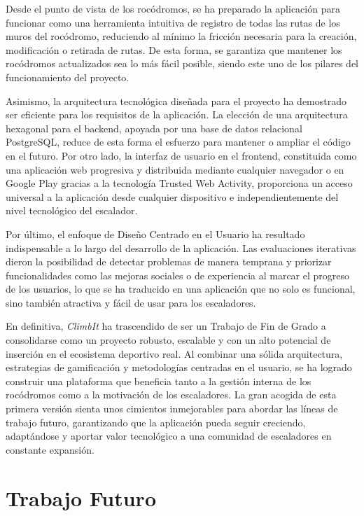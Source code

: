 Desde el punto de vista de los rocódromos, se ha preparado la aplicación para funcionar como una herramienta intuitiva de registro de todas las rutas de los muros del rocódromo, reduciendo al mínimo la fricción necesaria para la creación, modificación o retirada de rutas. De esta forma, se garantiza que mantener los rocódromos actualizados sea lo más fácil posible, siendo este uno de los pilares del funcionamiento del proyecto.

Asimismo, la arquitectura tecnológica diseñada para el proyecto ha demostrado ser eficiente para los requisitos de la aplicación. La elección de una arquitectura hexagonal para el backend, apoyada por una base de datos relacional PostgreSQL, reduce de esta forma el esfuerzo para mantener o ampliar el código en el futuro. Por otro lado, la interfaz de usuario en el frontend, constituida como una aplicación web progresiva y distribuida mediante cualquier navegador o en Google Play gracias a la tecnología Trusted Web Activity, proporciona un acceso universal a la aplicación desde cualquier dispositivo e independientemente del nivel tecnológico del escalador.

Por último, el enfoque de Diseño Centrado en el Usuario ha resultado indispensable a lo largo del desarrollo de la aplicación. Las evaluaciones iterativas dieron la posibilidad de detectar problemas de manera temprana y priorizar funcionalidades como las mejoras sociales o de experiencia al marcar el progreso de los usuarios, lo que se ha traducido en una aplicación que no solo es funcional, sino también atractiva y fácil de usar para los escaladores.

En definitiva, \textit{ClimbIt} ha trascendido de ser un Trabajo de Fin de Grado a consolidarse como un proyecto robusto, escalable y con un alto potencial de inserción en el ecosistema deportivo real. Al combinar una sólida arquitectura, estrategias de gamificación y metodologías centradas en el usuario, se ha logrado construir una plataforma que beneficia tanto a la gestión interna de los rocódromos como a la motivación de los escaladores. La gran acogida de esta primera versión sienta unos cimientos inmejorables para abordar las líneas de trabajo futuro, garantizando que la aplicación pueda seguir creciendo, adaptándose y aportar valor tecnológico a una comunidad de escaladores en constante expansión.

\section{Trabajo Futuro}

